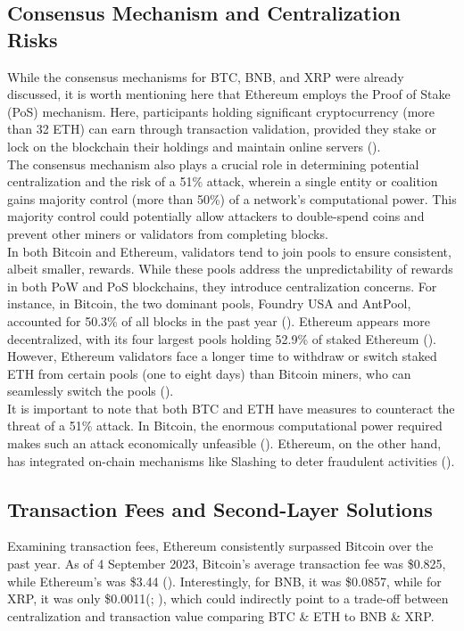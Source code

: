 \documentclass[twocolumn]{article}
\begin{document}
\subsection{Consensus Mechanism and Centralization Risks}
While the consensus mechanisms for BTC, BNB, and XRP were already discussed, it is worth mentioning here that Ethereum employs the Proof of Stake (PoS) mechanism. Here, participants holding significant cryptocurrency (more than 32 ETH) can earn through transaction validation, provided they stake or lock on the blockchain their holdings and maintain online servers (\cite{noauthor_proof--stake_2023}).
\\The consensus mechanism also plays a crucial role in determining potential centralization and the risk of a 51\% attack, wherein a single entity or coalition gains majority control (more than 50\%) of a network's computational power. This majority control could potentially allow attackers to double-spend coins and prevent other miners or validators from completing blocks. 
\\In both Bitcoin and Ethereum, validators tend to join pools to ensure consistent, albeit smaller, rewards. While these pools address the unpredictability of rewards in both PoW and PoS blockchains, they introduce centralization concerns. For instance, in Bitcoin, the two dominant pools, Foundry USA and AntPool, accounted for 50.3\% of all blocks in the past year (\cite{noauthor_pool_2023}). Ethereum appears more decentralized, with its four largest pools holding 52.9\% of staked Ethereum (\cite{noauthor_ethereum_2023-1}). However, Ethereum validators face a longer time to withdraw or switch staked ETH from certain pools (one to eight days) than Bitcoin miners, who can seamlessly switch the pools (\cite{noauthor_just_2023}).
\\It is important to note that both BTC and ETH have measures to counteract the threat of a 51\% attack. In Bitcoin, the enormous computational power required makes such an attack economically unfeasible (\cite{budish_economic_2022}). Ethereum, on the other hand, has integrated on-chain mechanisms like Slashing to deter fraudulent activities (\cite{noauthor_proof--stake_2023}).

\subsection{Transaction Fees and Second-Layer Solutions}

Examining transaction fees, Ethereum consistently surpassed Bitcoin over the past year. As of 4 September 2023, Bitcoin's average transaction fee was \$0.825, while Ethereum's was \$3.44 (\cite{noauthor_bitcoin_2023-1}). Interestingly, for BNB, it was \$0.0857, while for XRP, it was only \$0.0011(\cite{noauthor_binance_2023}; \cite{noauthor_xrp_2023}), which could indirectly point to a trade-off between centralization and transaction value comparing BTC \& ETH to BNB \& XRP. 
\end{document}
